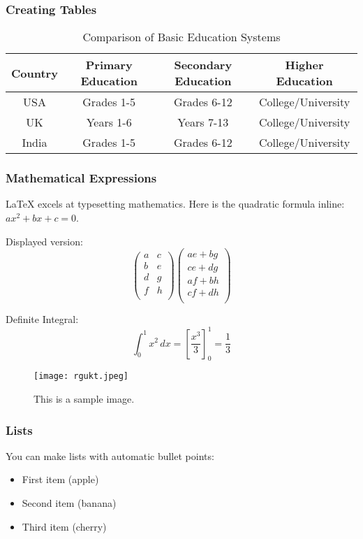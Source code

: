 \documentclass{article}
\begin{document}
\subsubsection{Creating Tables}
\begin{table}[h!]
    \centering
    \begin{tabular}{|c|c|c|c|}
        \hline
        Country & Primary Education & Secondary Education & Higher Education \\
        \hline
        USA & Grades 1-5 & Grades 6-12 & College/University \\
        \hline
        UK & Years 1-6 & Years 7-13 & College/University \\
        \hline
        India & Grades 1-5 & Grades 6-12 & College/University \\
        \hline
    \end{tabular}
    \caption{Comparison of Basic Education Systems}
\end{table}

\subsubsection{Mathematical Expressions}
LaTeX excels at typesetting mathematics. Here is the quadratic formula inline: \(ax^2 + bx + c = 0\).

Displayed version:
\[
\left( \begin{array}{cc}
a & c \\
b & e \\
d & g \\
f & h \\
\end{array} \right)
\left( \begin{array}{c}
ae + bg \\
ce + dg \\
af + bh \\
cf + dh \\
\end{array} \right)
\]

Definite Integral:
\[
\int_0^1 x^2 \, dx = \left[ \frac{x^3}{3} \right]_0^1 = \frac{1}{3}
\]

\begin{figure}[h!]
	\centering
	\texttt{[image: rgukt.jpeg]}
	\caption{This is a sample image.}
\end{figure} 
\newpage
\subsubsection{Lists}
You can make lists with automatic bullet points:
\begin{itemize}
    \item First item (apple)
    \item Second item (banana)
    \item Third item (cherry)
\end{itemize}
\end{document}
